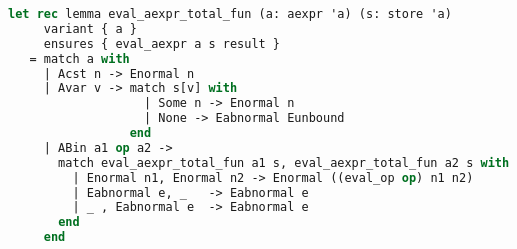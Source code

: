 \begin{lstlisting}[caption={Lemma combining totality and determinism for arithmetic expressions},label={lst:why3totfun},language=sml]
let rec lemma eval_aexpr_total_fun (a: aexpr 'a) (s: store 'a)
     variant { a }
     ensures { eval_aexpr a s result }
   = match a with
     | Acst n -> Enormal n
     | Avar v -> match s[v] with
                   | Some n -> Enormal n
                   | None -> Eabnormal Eunbound
                 end
     | ABin a1 op a2 ->
       match eval_aexpr_total_fun a1 s, eval_aexpr_total_fun a2 s with
         | Enormal n1, Enormal n2 -> Enormal ((eval_op op) n1 n2)
         | Eabnormal e, _   -> Eabnormal e
         | _ , Eabnormal e  -> Eabnormal e
       end
     end
\end{lstlisting}
